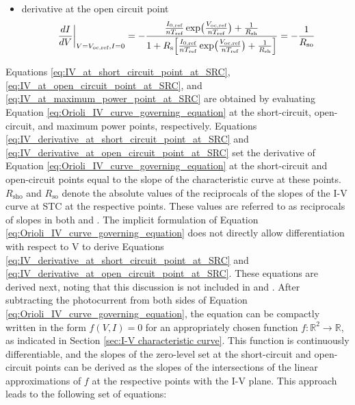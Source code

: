 \begin{itemize}
\begin{equation}
    \end{equation}
    \item derivative at the open circuit point
    \begin{equation}
        \left.\frac{dI}{dV}\right|_{ V = V_{\text{oc,ref}}, I = 0} = - \frac{\frac{I_{\text{0,ref}}}{nT_{\text{ref}}} \exp\bigl(\frac{V_{\text{oc,ref}}}{nT_{\text{ref}}}\bigr) + \frac{1}{R_{\text{sh}}}}{1 + R_{\text{s}}\Bigl[ \frac{I_{\text{0,ref}}}{nT_{\text{ref}}} \exp\bigl(\frac{V_{\text{oc,ref}}}{nT_{\text{ref}}}\bigr) + \frac{1}{R_{\text{sh}}} \Bigr]} = -\frac{1}{R_{\text{so}}}
        \label{eq:IV_derivative_at_open_circuit_point_at_SRC}
    \end{equation}
\end{itemize}

\noindent
Equations \ref{eq:IV_at_short_circuit_point_at_SRC}, \ref{eq:IV_at_open_circuit_point_at_SRC},
and \ref{eq:IV_at_maximum_power_point_at_SRC} are obtained by evaluating Equation
\ref{eq:Orioli_IV_curve_governing_equation} at the short-circuit, open-circuit,
and maximum power points, respectively. Equations
\ref{eq:IV_derivative_at_short_circuit_point_at_SRC} and \ref{eq:IV_derivative_at_open_circuit_point_at_SRC}
set the derivative of Equation \ref{eq:Orioli_IV_curve_governing_equation}
at the short-circuit and open-circuit points equal to the slope of the
characteristic curve at these points. \(R_{\text{sho}}\) and \(R_{\text{so}}\) denote
the absolute values of the reciprocals of the slopes of the I-V curve at STC
at the respective points. These values are referred to as
reciprocals of slopes in both \cite{LoBrano} and \cite{Orioli}.
The implicit formulation of Equation \ref{eq:Orioli_IV_curve_governing_equation}
does not directly allow differentiation with respect to V to derive Equations
\ref{eq:IV_derivative_at_short_circuit_point_at_SRC} and \ref{eq:IV_derivative_at_open_circuit_point_at_SRC}.
These equations are derived next, noting that this discussion is not
included in \cite{LoBrano} and \cite{Orioli}. After subtracting the photocurrent
from both sides of Equation \ref{eq:Orioli_IV_curve_governing_equation}, the
equation can be compactly written in the form \(f(V, I) = 0\) for an appropriately
chosen function \(f: \mathbb{R}^2 \rightarrow \mathbb{R}\), as indicated in Section
\ref{sec:I-V characteristic curve}. This function is continuously differentiable,
and the slopes of the zero-level set at the short-circuit and open-circuit
points can be derived as the slopes of the intersections of the linear
approximations of \(f\) at the respective points with the I-V plane.
This approach leads to the following set of equations:

